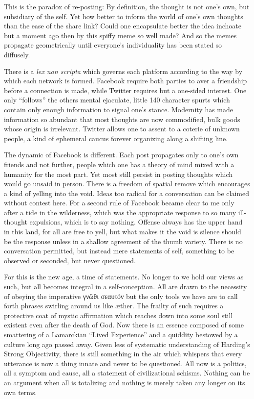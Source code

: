 \documentclass[ebook, 10pt, openright, onecolumn]{memoir}
\newcommand{\textgreek}[1]{\begingroup\fontencoding{LGR}\selectfont#1\endgroup}
\begin{document}
This is the paradox of re-posting: By definition, the thought is not one's own,
but subsidiary of the self.  Yet how better to inform the world of one's own
thoughts than the ease of the share link?  Could one encapsulate better the idea
inchoate but a moment ago then by this spiffy meme so well made?  And so the
memes propagate geometrically until everyone's individuality has been stated so
diffusely.

There is a \textit{lex non scripta} which governs each platform according to the
way by which each network is formed.  Facebook require both parties to aver a
friendship before a connection is made, while Twitter requires but a one-sided
interest.  One only ``follows'' the others mental ejaculate, little 140
character spurts which contain only enough information to signal one's stance.
Modernity has made information so abundant that most thoughts are now
commodified, bulk goods whose origin is irrelevant.  Twitter allows one to
assent to a coterie of unknown people, a kind of ephemeral caucus forever
organizing along a shifting line.

The dynamic of Facebook is different.  Each post propagates only to one's own
friends and not further, people which one has a theory of mind mixed with a
humanity for the most part.  Yet most still persist in posting thoughts which
would go unsaid in person.  There is a freedom of spatial remove which
encourages a kind of yelling into the void. Ideas too radical for a conversation
can be claimed without contest here.  For a second rule of Facebook became clear
to me only after a tide in the wilderness, which was the appropriate response to
so many ill-thought expulsions, which is to say nothing.  Offense always has the
upper hand in this land, for all are free to yell, but what makes it the void is
silence should be the response unless in a shallow agreement of the thumb
variety.  There is no conversation permitted, but instead mere statements of
self, something to be observed or seconded, but never questioned.

For this is the new age, a time of statements.  No longer to we hold our views
as such, but all becomes integral in a self-conception. All are drawn to the
necessity of obeying the imperative \textgreek{γνῶθι σεαυτόν} but the only tools
we have are to call forth phrases swirling around us like {\ae}ther.  The
frailty of such requires a protective coat of mystic affirmation which reaches
down into some soul still existent even after the death of God. Now there is an
essence composed of some smattering of a Lamarckian ``Lived Experience'' and a
quiddity bestowed by a culture long ago passed away.  Given less of systematic
understanding of Harding's Strong Objectivity, there is still something in the
air which whispers that every utterance is now a thing innate and never to be
questioned.  All now is a politics, all a symptom and cause, all a statement of
civilizational schisms.  Nothing can be an argument when all is totalizing and
nothing is merely taken any longer on its own terms.
\end{document}
